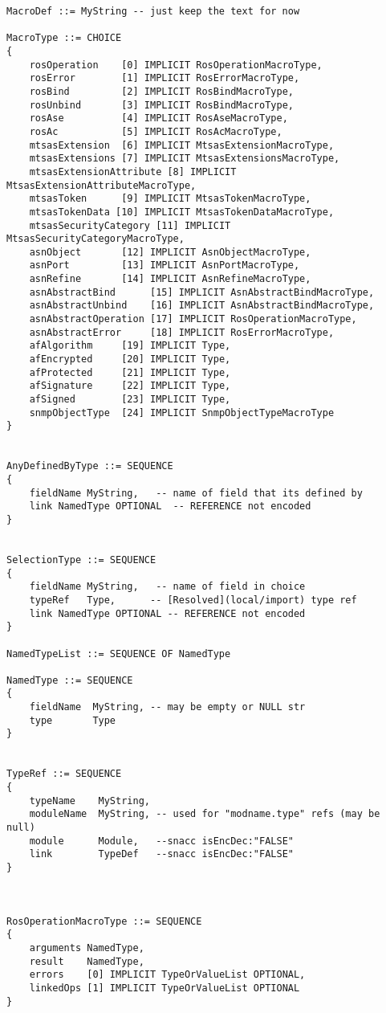 \begin{small}
\begin{verbatim}
MacroDef ::= MyString -- just keep the text for now

MacroType ::= CHOICE
{
    rosOperation    [0] IMPLICIT RosOperationMacroType,
    rosError        [1] IMPLICIT RosErrorMacroType,
    rosBind         [2] IMPLICIT RosBindMacroType,
    rosUnbind       [3] IMPLICIT RosBindMacroType,
    rosAse          [4] IMPLICIT RosAseMacroType,
    rosAc           [5] IMPLICIT RosAcMacroType,
    mtsasExtension  [6] IMPLICIT MtsasExtensionMacroType,
    mtsasExtensions [7] IMPLICIT MtsasExtensionsMacroType,
    mtsasExtensionAttribute [8] IMPLICIT MtsasExtensionAttributeMacroType,
    mtsasToken      [9] IMPLICIT MtsasTokenMacroType,
    mtsasTokenData [10] IMPLICIT MtsasTokenDataMacroType,
    mtsasSecurityCategory [11] IMPLICIT MtsasSecurityCategoryMacroType,
    asnObject       [12] IMPLICIT AsnObjectMacroType,
    asnPort         [13] IMPLICIT AsnPortMacroType,
    asnRefine       [14] IMPLICIT AsnRefineMacroType,
    asnAbstractBind      [15] IMPLICIT AsnAbstractBindMacroType,
    asnAbstractUnbind    [16] IMPLICIT AsnAbstractBindMacroType,
    asnAbstractOperation [17] IMPLICIT RosOperationMacroType,
    asnAbstractError     [18] IMPLICIT RosErrorMacroType,
    afAlgorithm     [19] IMPLICIT Type,
    afEncrypted     [20] IMPLICIT Type,
    afProtected     [21] IMPLICIT Type,
    afSignature     [22] IMPLICIT Type,
    afSigned        [23] IMPLICIT Type,
    snmpObjectType  [24] IMPLICIT SnmpObjectTypeMacroType
}


AnyDefinedByType ::= SEQUENCE
{
    fieldName MyString,   -- name of field that its defined by
    link NamedType OPTIONAL  -- REFERENCE not encoded
}


SelectionType ::= SEQUENCE
{
    fieldName MyString,   -- name of field in choice
    typeRef   Type,      -- [Resolved](local/import) type ref
    link NamedType OPTIONAL -- REFERENCE not encoded
}

NamedTypeList ::= SEQUENCE OF NamedType

NamedType ::= SEQUENCE
{
    fieldName  MyString, -- may be empty or NULL str
    type       Type
}


TypeRef ::= SEQUENCE
{
    typeName    MyString,
    moduleName  MyString, -- used for "modname.type" refs (may be null)
    module      Module,   --snacc isEncDec:"FALSE"
    link        TypeDef   --snacc isEncDec:"FALSE"
}



RosOperationMacroType ::= SEQUENCE
{
    arguments NamedType,
    result    NamedType,
    errors    [0] IMPLICIT TypeOrValueList OPTIONAL,
    linkedOps [1] IMPLICIT TypeOrValueList OPTIONAL
}


\end{verbatim}
\end{small}
